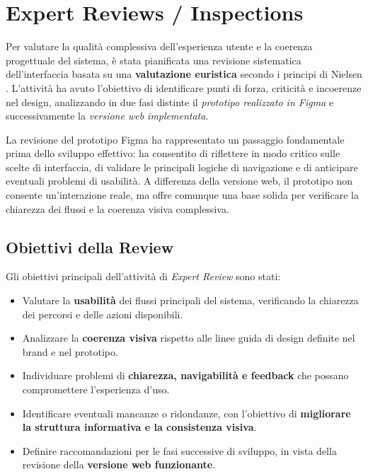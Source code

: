 \section{Expert Reviews / Inspections}

Per valutare la qualità complessiva dell’esperienza utente e la coerenza progettuale del sistema, è stata pianificata una revisione sistematica dell’interfaccia basata su una \textbf{valutazione euristica} secondo i principi di Nielsen \cite{nielsen1995}.  
L’attività ha avuto l’obiettivo di identificare punti di forza, criticità e incoerenze nel design, analizzando in due fasi distinte il \textit{prototipo realizzato in Figma} e successivamente la \textit{versione web implementata}.  

La revisione del prototipo Figma ha rappresentato un passaggio fondamentale prima dello sviluppo effettivo: ha consentito di riflettere in modo critico sulle scelte di interfaccia, di validare le principali logiche di navigazione e di anticipare eventuali problemi di usabilità.  
A differenza della versione web, il prototipo non consente un’interazione reale, ma offre comunque una base solida per verificare la chiarezza dei flussi e la coerenza visiva complessiva.

\subsection*{Obiettivi della Review}

Gli obiettivi principali dell’attività di \textit{Expert Review} sono stati:
\begin{itemize}
    \item Valutare la \textbf{usabilità} dei flussi principali del sistema, verificando la chiarezza dei percorsi e delle azioni disponibili.
    \item Analizzare la \textbf{coerenza visiva} rispetto alle linee guida di design definite nel brand e nel prototipo.
    \item Individuare problemi di \textbf{chiarezza, navigabilità e feedback} che possano compromettere l’esperienza d’uso.
    \item Identificare eventuali mancanze o ridondanze, con l’obiettivo di \textbf{migliorare la struttura informativa e la consistenza visiva}.
    \item Definire raccomandazioni per le fasi successive di sviluppo, in vista della revisione della \textbf{versione web funzionante}.
\end{itemize}

